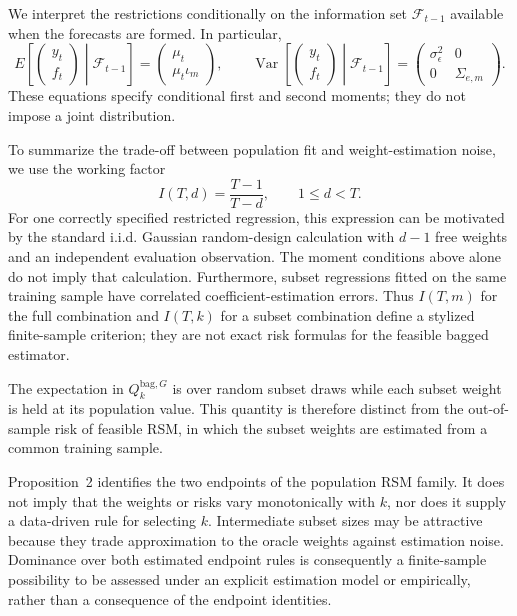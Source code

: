 
We interpret the restrictions conditionally on the information set
$\mathcal F_{t-1}$ available when the forecasts are formed. In particular,
\[
 E\!\left[\begin{pmatrix}y_t\\f_t\end{pmatrix}\middle|\mathcal F_{t-1}\right]
 =\begin{pmatrix}\mu_t\\\mu_t\iota_m\end{pmatrix},
 \qquad
 \operatorname{Var}\!\left[
 \begin{pmatrix}y_t\\f_t\end{pmatrix}\middle|\mathcal F_{t-1}\right]
 =\begin{pmatrix}\sigma_\epsilon^2&0\\0&\Sigma_{e,m}\end{pmatrix}.
\]
These equations specify conditional first and second moments; they do not
impose a joint distribution.

To summarize the trade-off between population fit and weight-estimation
noise, we use the working factor
\[
 I(T,d)=\frac{T-1}{T-d},\qquad 1\le d<T.
\]
For one correctly specified restricted regression, this expression can be
motivated by the standard i.i.d. Gaussian random-design calculation with
$d-1$ free weights and an independent evaluation observation. The moment
conditions above alone do not imply that calculation. Furthermore, subset
regressions fitted on the same training sample have correlated
coefficient-estimation errors. Thus $I(T,m)$ for the full combination and
$I(T,k)$ for a subset combination define a stylized finite-sample criterion;
they are not exact risk formulas for the feasible bagged estimator.

The expectation in $Q_k^{\mathrm{bag},G}$ is over random subset draws while
each subset weight is held at its population value. This quantity is
therefore distinct from the out-of-sample risk of feasible RSM, in which the
subset weights are estimated from a common training sample.

Proposition~2 identifies the two endpoints of the population RSM family. It
does not imply that the weights or risks vary monotonically with $k$, nor
does it supply a data-driven rule for selecting $k$. Intermediate subset
sizes may be attractive because they trade approximation to the oracle
weights against estimation noise. Dominance over both estimated endpoint
rules is consequently a finite-sample possibility to be assessed under an
explicit estimation model or empirically, rather than a consequence of the
endpoint identities.

